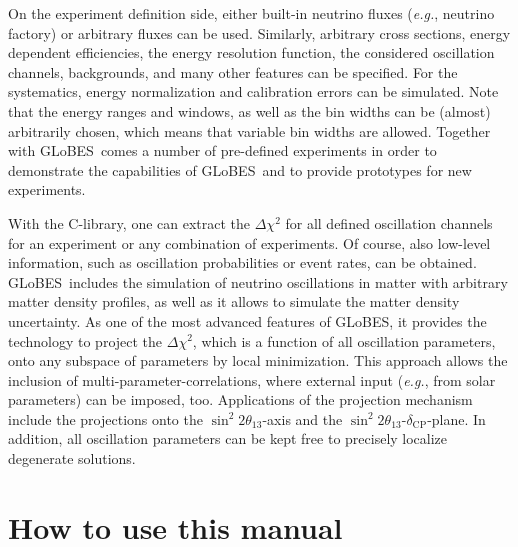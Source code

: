 \documentclass[a4paper,12pt,twoside]{book}
\newcommand{\deltacp}{\delta_{\mathrm{CP}}}
\newcommand{\stheta}{\sin^2 2 \theta_{13}}
\newcommand{\eg}{{\it e.g.}}
\newcommand{\GLOBES}{{\sf GLoBES}}
\begin{document}
On the experiment definition side, either built-in neutrino fluxes
(\eg, neutrino factory) or arbitrary fluxes can be used. Similarly,
arbitrary cross sections, energy dependent efficiencies, the
energy resolution function, the considered oscillation channels, 
backgrounds, and many other features can be specified. 
For the systematics, energy
normalization and calibration errors can be simulated. Note that
the energy ranges and windows, as well as the bin widths can be
(almost) arbitrarily chosen, which means that variable bin
widths are allowed. Together with \GLOBES\ comes a number of
pre-defined experiments in order to demonstrate the capabilities
of \GLOBES\ and to provide prototypes for new experiments.

With the C-library, one can extract the $\Delta \chi^2$ for all defined 
oscillation channels for an experiment or any combination of experiments.
Of course, also low-level information, such as oscillation
probabilities or event rates, can be obtained. \GLOBES\ includes the
simulation of neutrino oscillations in matter with arbitrary matter 
density profiles, as well as it allows to simulate the matter density
uncertainty. As one of the most
advanced features of \GLOBES , it provides the technology to 
project the $\Delta \chi^2$, which is a function of all oscillation
parameters, onto any subspace of parameters by local minimization. 
This approach allows the inclusion of multi-parameter-correlations,
where external input (\eg, from solar parameters) can be imposed, too.
Applications of the projection mechanism include the projections onto the $\stheta$-axis and the $\stheta$-$\deltacp$-plane. In addition, all oscillation parameters can be kept free to precisely localize 
degenerate solutions.

\cleardoublepage
\tableofcontents

\cleardoublepage
\setcounter{page}{1}

\chapter*{How to use this manual}
\end{document}
